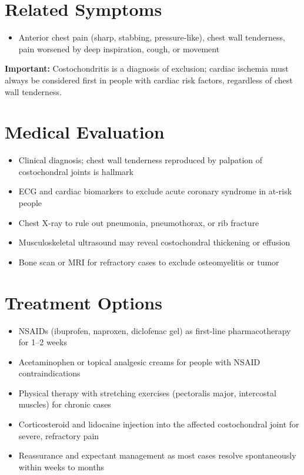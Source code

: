 \section*{Related Symptoms}
\begin{itemize}
  \item Anterior chest pain (sharp, stabbing, pressure-like), chest wall tenderness, pain worsened by deep inspiration, cough, or movement
\end{itemize}
\textbf{Important:} Costochondritis is a diagnosis of exclusion; cardiac ischemia must always be considered first in people with cardiac risk factors, regardless of chest wall tenderness.

\section*{Medical Evaluation}
\begin{itemize}
  \item Clinical diagnosis; chest wall tenderness reproduced by palpation of costochondral joints is hallmark
  \item ECG and cardiac biomarkers to exclude acute coronary syndrome in at-risk people
  \item Chest X-ray to rule out pneumonia, pneumothorax, or rib fracture
  \item Musculoskeletal ultrasound may reveal costochondral thickening or effusion
  \item Bone scan or MRI for refractory cases to exclude osteomyelitis or tumor
\end{itemize}

\section*{Treatment Options}
\begin{itemize}
  \item NSAIDs (ibuprofen, naproxen, diclofenac gel) as first-line pharmacotherapy for 1--2 weeks
  \item Acetaminophen or topical analgesic creams for people with NSAID contraindications
  \item Physical therapy with stretching exercises (pectoralis major, intercostal muscles) for chronic cases
  \item Corticosteroid and lidocaine injection into the affected costochondral joint for severe, refractory pain
  \item Reassurance and expectant management as most cases resolve spontaneously within weeks to months
\end{itemize}

